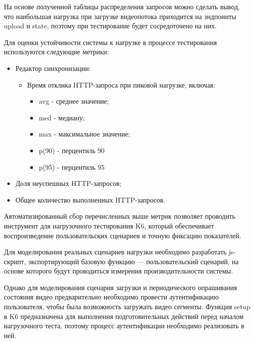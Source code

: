 	На основе полученной таблицы распределения запросов можно сделать вывод, что наибольшая нагрузка при загрузке видеопотока приходится на эндпоинты upload и state, поэтому при тестирование будет сосредоточено на них.

	Для оценки устойчивости системы к нагрузке в процессе тестирования используются следующие метрики:
	
	\begin{itemize}[label=$\bullet$]
		\item Редактор синхронизации:
		\begin{itemize}[label=$\circ$]
			\item Время отклика HTTP-запроса при пиковой нагрузке, включая:
			\begin{itemize}[label=$\circ$]
				\item avg - среднее значение;
				\item med - медиану;
				\item max - максимальное значение;
				\item p(90) - перцентиль 90%
				\item p(95) - перцентиль 95%
			\end{itemize}
		\end{itemize}
		\item Доля неуспешных HTTP-запросов;
		\item Общее количество выполненных HTTP-запросов.
	\end{itemize}
	
	Автоматизированный сбор перечисленных выше метрик позволяет проводить инструмент для нагрузочного тестирования K6, который обеспечивает воспроизведение пользовательских сценариев и точную фиксацию показателей.

	Для моделирования реальных сценариев нагрузки необходимо разработать js-скрипт, экспортирующий базовую функцию — пользовательский сценарий, на основе которого будут проводиться измерения производительности системы.

	Однако для моделирования сценария загрузки и периодического опрашивания состояния видео предварительно необходимо провести аутентификацию пользователя, чтобы была возможность загружать видео сегменты. Функция setup в K6 предназначена для выполнения подготовительных действий перед началом нагрузочного теста, поэтому процесс аутентификации необходимо реализовать в ней.
	
